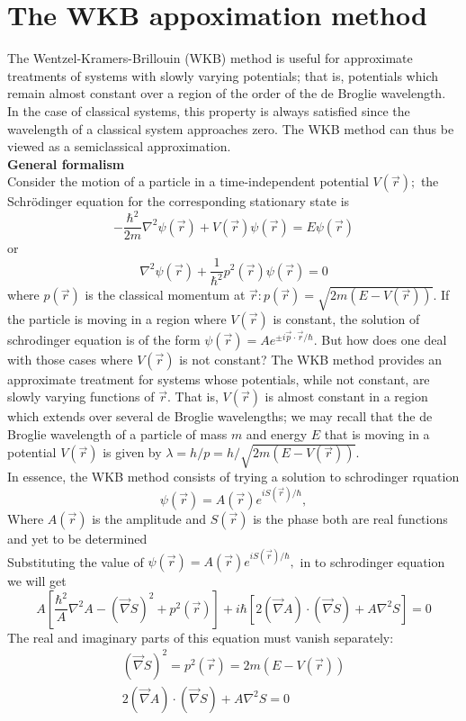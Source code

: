 \section{The WKB appoximation method}
The Wentzel-Kramers-Brillouin (WKB) method is useful for approximate treatments of systems with slowly varying potentials; that is, potentials which remain almost constant over a region of the order of the de Broglie wavelength. In the case of classical systems, this property is always satisfied since the wavelength of a classical system approaches zero. The WKB method can thus be viewed as a semiclassical approximation.\\
\textbf{General formalism}\\
Consider the motion of a particle in a time-independent potential $V(\vec{r}) ;$ the Schrödinger equation for the corresponding stationary state is
$$
-\frac{\hbar^{2}}{2 m} \nabla^{2} \psi(\vec{r})+V(\vec{r}) \psi(\vec{r})=E \psi(\vec{r})
$$
or
$$
\nabla^{2} \psi(\vec{r})+\frac{1}{\hbar^{2}} p^{2}(\vec{r}) \psi(\vec{r})=0
$$
where $p(\vec{r})$ is the classical momentum at $\vec{r}: p(\vec{r})=\sqrt{2 m(E-V(\vec{r}))}$. If the particle is moving in a region where $V(\vec{r})$ is constant, the solution of schrodinger equation is of the form $\psi(\vec{r})=A e^{\pm i \vec{p} \cdot \vec{r} / \hbar} .$ But how does one deal with those cases where $V(\vec{r})$ is not constant? The WKB method provides an approximate treatment for systems whose potentials, while not constant, are slowly varying functions of $\vec{r}$. That is, $V(\vec{r})$ is almost constant in a region which extends over several de Broglie wavelengths; we may recall that the de Broglie wavelength of a particle of mass $m$ and energy $E$ that is moving in a potential $V(\vec{r})$ is given by $\lambda=h / p=h / \sqrt{2 m(E-V(\vec{r}))}$.\\
In essence, the WKB method consists of trying a solution to schrodinger rquation
$$
\psi(\vec{r})=A(\vec{r}) e^{i S(\vec{r}) / \hbar},
$$
Where $A(\vec{r})$ is the amplitude and $S(\vec{r})$ is the phase both are real functions and yet to be determined\\
Substituting the value of $
\psi(\vec{r})=A(\vec{r}) e^{i S(\vec{r}) / \hbar},
$ in to schrodinger equation we will get\\
$$A\left[\frac{\hbar^{2}}{A} \nabla^{2} A-(\vec{\nabla} S)^{2}+p^{2}(\vec{r})\right]+i \hbar\left[2(\vec{\nabla} A) \cdot(\vec{\nabla} S)+A \nabla^{2} S\right]=0$$
The real and imaginary parts of this equation must vanish separately:
$$
\begin{gathered}
(\vec{\nabla} S)^{2}=p^{2}(\vec{r})=2 m(E-V(\vec{r})) \\
2(\vec{\nabla} A) \cdot(\vec{\nabla} S)+A \nabla^{2} S=0
\end{gathered}
$$
